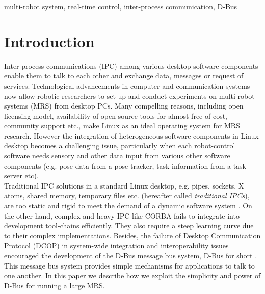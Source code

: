 \documentclass{ifacconf}
\begin{document}
\begin{frontmatter}
\begin{keyword}
multi-robot system, real-time control, inter-process communication, D-Bus
\end{keyword}

\end{frontmatter}
\section{Introduction}
Inter-process communications (IPC) among various desktop software components enable them to talk to each other and exchange data, messages or request of services. Technological advancements in computer and communication systems now allow robotic researchers to set-up and conduct experiments on multi-robot systems (MRS) from desktop PCs. Many compelling reasons, including open licensing model, availability of open-source tools for almost free of cost, community support etc., make Linux as an ideal operating system for MRS research. However the integration of heterogeneous software components in Linux desktop becomes a challenging issue, particularly when each robot-control software needs sensory and other data input from various other software components (e.g. pose data from a pose-tracker, task information from a task-server etc).\\ 
Traditional IPC solutions in a standard Linux desktop, e.g. pipes, sockets, X atoms, shared memory, temporary files etc. (hereafter called {\em traditional IPCs}), are too static and rigid to meet the demand of a dynamic software system \citep{wittenburg2005}. On the other hand, complex and heavy IPC like CORBA fails to integrate into  development tool-chains efficiently. They also require a steep learning curve due to their complex implementations. Besides, the failure of Desktop Communication Protocol (DCOP) in system-wide integration and interoperability issues encouraged the development of the D-Bus message bus system, D-Bus for short \citep{Pennington+2010}. This message bus system provides simple mechanisms for applications to talk to one another. In this paper we describe  how we exploit the simplicity and power of D-Bus  for running a large MRS.\\
\end{document}
